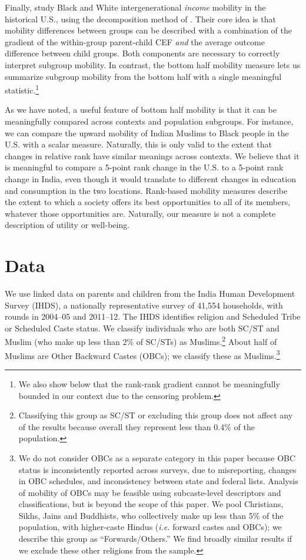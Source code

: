 \documentclass[12pt,letterpaper]{article}
\numberwithin{equation}{section}
\begin{document}
Finally,  study Black and White intergenerational \textit{income} mobility in the historical U.S., using the decomposition method of . Their core idea is that mobility differences between groups can be described with a combination of the gradient of the within-group parent-child CEF \textit{and} the average outcome difference between child groups. Both components are necessary to correctly interpret subgroup mobility. In contrast, the bottom half mobility measure lets us summarize subgroup mobility from the bottom half with a single meaningful statistic.\footnote{We also show below that the rank-rank gradient cannot be meaningfully bounded in our context due to the censoring problem.}

As we have noted, a useful feature of bottom half mobility is that it can be meaningfully compared across contexts and population subgroups. For instance, we can compare the upward mobility of Indian Muslims to Black people in the U.S. with a scalar measure. Naturally, this is only valid to the extent that changes in relative rank have similar meanings across contexts. We believe that it is meaningful to compare a 5-point rank change in the U.S. to a 5-point rank change in India, even though it would translate to different changes in education and consumption in the two locations. Rank-based mobility measures describe the extent to which a society offers its best opportunities to all of its members, whatever those opportunities are. Naturally, our measure is not a complete description of utility or well-being. 

\section{Data}
\label{sec:data} 

We use linked data on parents and children from the India Human Development Survey (IHDS), a nationally representative survey of 41,554 households, with rounds in 2004--05 and 2011--12.  The IHDS identifies religion and Scheduled Tribe or Scheduled Caste status. We classify individuals who are both SC/ST and Muslim (who make up less than 2\% of SC/STs) as Muslims.\footnote{Classifying this group as SC/ST or excluding this group does not affect any of the results because overall they represent less than 0.4\% of the population.} About half of Muslims are Other Backward Castes (OBCs); we classify these as Muslims.\footnote{We do not consider OBCs as a separate category in this paper because OBC status is inconsistently reported across surveys, due to misreporting, changes in OBC schedules, and inconsistency between state and federal lists. Analysis of mobility of OBCs may be feasible using subcaste-level descriptors and classifications, but is beyond the scope of this paper. We pool Christians, Sikhs, Jains and Buddhists, who collectively make up less than 5\% of the population, with higher-caste Hindus (\textit{i.e.} forward castes and OBCs); we describe this group as ``Forwards/Others.'' We find broadly similar results if we exclude these other religions from the sample.}
\end{document}
